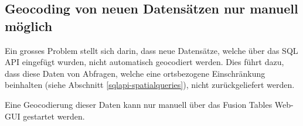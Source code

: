 \subsection{Geocoding von neuen Datensätzen nur manuell möglich}
\label{geocodierung-bug}
Ein grosses Problem stellt sich darin, dass neue Datensätze, welche über das SQL \gls{API} eingefügt wurden, nicht automatisch geocodiert werden. Dies führt dazu, dass diese Daten von Abfragen, welche eine ortsbezogene Einschränkung beinhalten (siehe Abschnitt \ref{sqlapi-spatialqueries}), nicht zurückgeliefert werden.

Eine \gls{Geocodierung} dieser Daten kann nur manuell über das Fusion Tables Web-GUI gestartet werden.